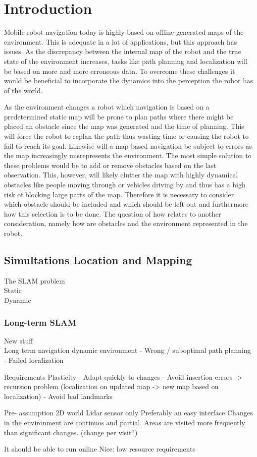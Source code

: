 \chapter{Introduction}

Mobile robot navigation today is highly based on offline generated maps of the environment. This is adequate in a lot of applications, but this approach has issues. As the discrepancy between the internal map of the robot and the true state of the environment increases, tasks like path planning and localization will be based on more and more erroneous data. To overcome these challenges it would be beneficial to incorporate the dynamics into the perception the robot has of the world.

As the environment changes a robot which navigation is based on a predetermined static map will be prone to plan paths where there might be placed an obstacle since the map was generated and the time of planning. This will force the robot to replan the path thus wasting time or causing the robot to fail to reach its goal. Likewise will a map based navigation be subject to errors as the map increasingly misrepresents the environment. The most simple solution to these problems would be to add or remove obstacles based on the last observation. This, however, will likely clutter the map with highly dynamical obstacles like people moving through or vehicles driving by and thus has a high risk of blocking large parts of the map. Therefore it is necessary to consider which obstacle should be included and which should be left out and furthermore how this selection is to be done. The question of how relates to another consideration, namely how are obstacles and the environment represented in the robot.

\section{Simultations Location and Mapping}
The SLAM problem \\
Static \\ 
Dynamic \\

\subsection{Long-term SLAM}

New stuff\\
Long term navigation dynamic environment
- Wrong / suboptimal path planning
- Failed localization

Requirements
Plasticity
- Adapt quickly to changes 
- Avoid insertion errors -> recursion problem (localization on updated map -> new map based on localization)
- Avoid bad landmarks

Pre- assumption
2D world
Lidar sensor only
Preferably an easy interface 
Changes in the environment are continuos and partial. Areas are visited more frequently than significant changes. (change per visit?)

It should be able to run online
Nice: low resource requirements




